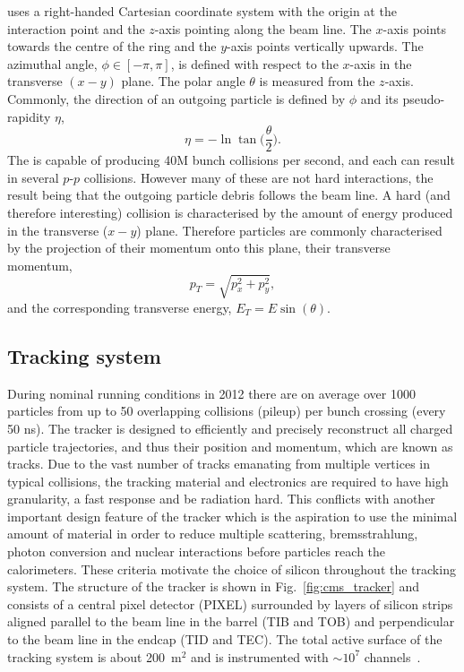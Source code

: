 \CMS uses a right-handed Cartesian coordinate system with the origin at the interaction point and the $z$-axis pointing along the beam line. The $x$-axis points towards the centre of the \LHC ring and the $y$-axis points vertically upwards. The azimuthal angle, $\phi \in [-\pi,\pi]$, is defined with respect to the $x$-axis in the transverse $(x-y)$ plane. The polar angle $\theta$ is measured from the $z$-axis. Commonly, the direction of an outgoing particle is defined by $\phi$ and its pseudo-rapidity $\eta$,
\begin{equation}
	\eta = -\ln\tan\biggl(\frac{\theta}{2}\biggr).
\end{equation}
The \LHC is capable of producing 40M bunch collisions per second, and each can result in several $p$-$p$ collisions. However many of these are not hard interactions, the result being that the outgoing particle debris follows the beam line. A hard (and therefore interesting) collision is characterised by the amount of energy produced in the transverse ($x-y$) plane. Therefore particles are commonly characterised by the projection of their momentum onto this plane, their transverse momentum,
\begin{equation}
	p_{T} = \sqrt{p_{x}^{2}+p_{y}^{2}},
\end{equation}
and the corresponding transverse energy, $E_{T} = E\sin(\theta)$.

\subsection{Tracking system}
\label{sec:tracker}

During nominal \LHC running conditions in 2012 there are on average over 1000 particles from up to 50 overlapping \pp collisions (pileup) per bunch crossing (every 50 ns). The tracker is designed to efficiently and precisely reconstruct all charged particle trajectories, and thus their position and momentum, which are known as tracks. Due to the vast number of tracks emanating from multiple vertices in typical \LHC collisions, the tracking material and electronics are required to have high granularity, a fast response and be radiation hard. This conflicts with another important design feature of the tracker which is the aspiration to use the minimal amount of material in order to reduce multiple scattering, bremsstrahlung, photon conversion and nuclear interactions before particles reach the calorimeters. These criteria motivate the choice of silicon throughout the \CMS tracking system. The structure of the \CMS tracker is shown in Fig.~\ref{fig:cms_tracker} and consists of a central pixel detector (PIXEL) surrounded by layers of silicon strips aligned parallel to the beam line in the barrel (TIB and TOB) and perpendicular to the beam line in the endcap (TID and TEC). The total active surface of the tracking system is about 200~m$^{2}$ and is instrumented with $\sim10^{7}$ channels~\cite{tracker_project}.


